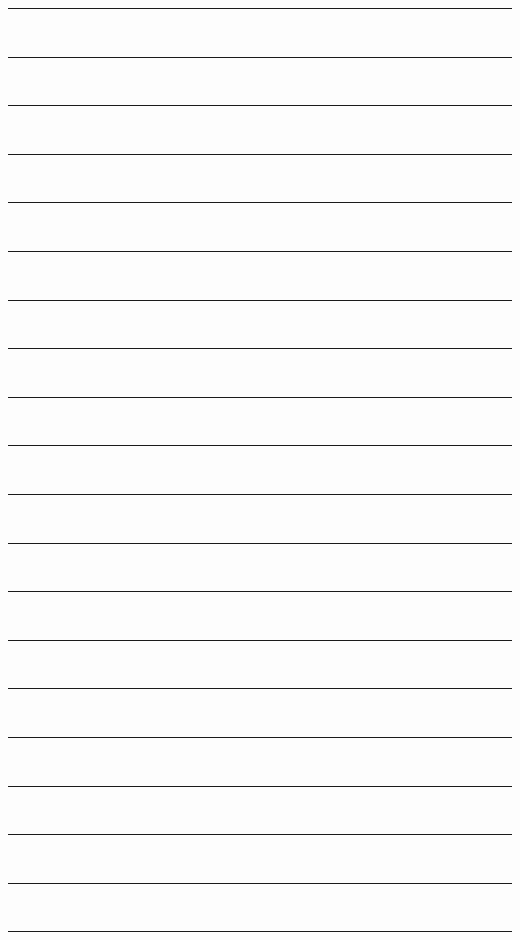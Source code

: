 \documentclass[14pt, fleqn, paper=letter, oneside]{scrartcl}
\begin{document}
\newcommand{\writtenlinespace}{3mm}
\noindent\rule{\textwidth}{0.4pt}\\[\writtenlinespace]
\noindent\rule{\textwidth}{0.4pt}\\[\writtenlinespace]
\noindent\rule{\textwidth}{0.4pt}\\[\writtenlinespace]
\noindent\rule{\textwidth}{0.4pt}\\[\writtenlinespace]
\noindent\rule{\textwidth}{0.4pt}\\[\writtenlinespace]
\noindent\rule{\textwidth}{0.4pt}\\[\writtenlinespace]
\noindent\rule{\textwidth}{0.4pt}\\[\writtenlinespace]
\noindent\rule{\textwidth}{0.4pt}\\[\writtenlinespace]
\noindent\rule{\textwidth}{0.4pt}\\[\writtenlinespace]
\noindent\rule{\textwidth}{0.4pt}\\[\writtenlinespace]
\noindent\rule{\textwidth}{0.4pt}\\[\writtenlinespace]
\noindent\rule{\textwidth}{0.4pt}\\[\writtenlinespace]
\noindent\rule{\textwidth}{0.4pt}\\[\writtenlinespace]
\noindent\rule{\textwidth}{0.4pt}\\[\writtenlinespace]
\noindent\rule{\textwidth}{0.4pt}\\[\writtenlinespace]
\noindent\rule{\textwidth}{0.4pt}\\[\writtenlinespace]
\noindent\rule{\textwidth}{0.4pt}\\[\writtenlinespace]
\noindent\rule{\textwidth}{0.4pt}\\[\writtenlinespace]
\noindent\rule{\textwidth}{0.4pt}\\[\writtenlinespace]
\noindent\rule{\textwidth}{0.4pt}\\[\writtenlinespace]
\end{document}
